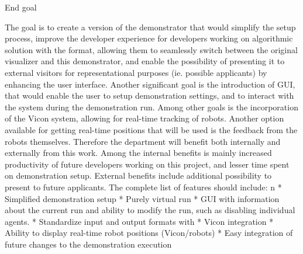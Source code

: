 \sec End goal

The goal is to create a version of the demonstrator that would simplify the setup process, improve the developer experience for developers working on algorithmic solution with the {\mapfIR} format, allowing them to seamlessly switch between the original visualizer and this demonstrator, and enable the possibility of presenting it to external visitors for representational purposes (ie. possible applicants) by enhancing the user interface.\br
Another significant goal is the introduction of GUI, that would enable the user to setup demonstration settings, and to interact with the system during the demonstration run.
Among other goals is the incorporation of the Vicon system, allowing for real-time tracking of robots. Another option available for getting real-time positions that will be used is the feedback from the robots themselves.\br
\br
Therefore the department will benefit both internally and externally from this work. Among the internal benefits is mainly increased productivity of future developers working on this project, and lesser time spent on demonstration setup. External benefits include additional possibility to present to future applicants.
The complete list of features should include:
\begitems \style n
    * Simplified demonstration setup
    * Purely virtual run
    * GUI with information about the current run and ability to modify the run, such as disabling individual agents. 
    * Standardize input and output formats with \mapfIR
    * Vicon integration
    * Ability to display real-time robot positions (Vicon/robots)
    * Easy integration of future changes to the demonstration execution
\enditems